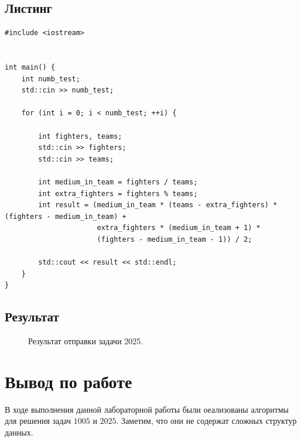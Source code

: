 \documentclass[a5paper, 10pt]{article}
\theoremstyle{definition}
\theoremstyle{plain}
\theoremstyle{remark}
\begin{document}
\subsection{Листинг}

\begin{center}
\begin{lstlisting}[label=some-code,caption={Исходный код для 2025}]
#include <iostream>


int main() {
    int numb_test;
    std::cin >> numb_test;

    for (int i = 0; i < numb_test; ++i) {

        int fighters, teams;
        std::cin >> fighters;
        std::cin >> teams;

        int medium_in_team = fighters / teams;
        int extra_fighters = fighters % teams;
        int result = (medium_in_team * (teams - extra_fighters) * (fighters - medium_in_team) +
                      extra_fighters * (medium_in_team + 1) *
                      (fighters - medium_in_team - 1)) / 2;

        std::cout << result << std::endl;
    }
}

\end{lstlisting}
\end{center}

\subsection{Результат}
\begin{figure}[h]
\caption{Результат отправки задачи 2025.}
\end{figure}

\newpage
\section{Вывод по работе}
В ходе выполнения данной лабораторной работы были оеализованы алгоритмы для решения задач $1005$ и $2025$. Заметим, что они не содержат сложных структур данных.
\end{document}

